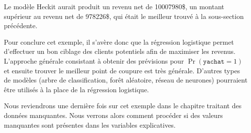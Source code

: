 \documentclass[
  11pt,
  letterpaper,
]{scrbook}
\newenvironment{Shaded}{\begin{snugshade}}{\end{snugshade}}
\newcommand{\AttributeTok}[1]{\textcolor[rgb]{0.40,0.45,0.13}{#1}}
\newcommand{\CommentTok}[1]{\textcolor[rgb]{0.37,0.37,0.37}{#1}}
\newcommand{\DecValTok}[1]{\textcolor[rgb]{0.68,0.00,0.00}{#1}}
\newcommand{\FunctionTok}[1]{\textcolor[rgb]{0.28,0.35,0.67}{#1}}
\newcommand{\NormalTok}[1]{\textcolor[rgb]{0.00,0.23,0.31}{#1}}
\newcommand{\OtherTok}[1]{\textcolor[rgb]{0.00,0.23,0.31}{#1}}
\newcommand{\SpecialCharTok}[1]{\textcolor[rgb]{0.37,0.37,0.37}{#1}}
\newcommand{\StringTok}[1]{\textcolor[rgb]{0.13,0.47,0.30}{#1}}
\theoremstyle{definition}
\theoremstyle{remark}
\begin{document}
\begin{Shaded}
\end{Shaded}

\begin{table}

\end{table}

Le modèle Heckit aurait produit un revenu net de 10007980\$, un montant
supérieur au revenu net de 978226\$, qui était le meilleur trouvé à la
sous-section précédente.

Pour conclure cet exemple, il s'avère donc que la régression logistique
permet d'effectuer un bon ciblage des clients potentiels afin de
maximiser les revenus. L'approche générale consistant à obtenir des
prévisions pour \(\Pr(\texttt{yachat}=1)\) et ensuite trouver le
meilleur point de coupure est très générale. D'autres types de modèles
(arbre de classification, forêt aléatoire, réseau de neurones)
pourraient être utilisés à la place de la régression logistique.

Nous reviendrons une dernière fois sur cet exemple dans le chapitre
traitant des données manquantes. Nous verrons alors comment procéder si
des valeurs manquantes sont présentes dans les variables explicatives.
\end{document}
